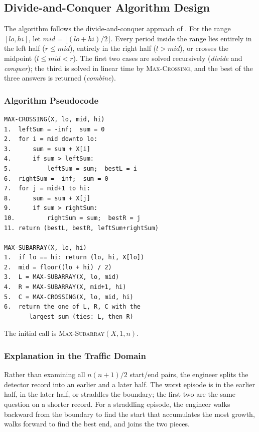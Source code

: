 \subsection{Divide-and-Conquer Algorithm Design}

The algorithm follows the divide-and-conquer approach
of \cite{bentley1984, clrs2009}. For the range
$[\mathit{lo}, \mathit{hi}]$, let
$\mathit{mid} = \lfloor (\mathit{lo} + \mathit{hi})/2 \rfloor$.
Every period inside the range lies entirely in the left
half ($r \le \mathit{mid}$), entirely in the right half
($l > \mathit{mid}$), or crosses the midpoint
($l \le \mathit{mid} < r$). The first two cases are
solved recursively (\emph{divide} and \emph{conquer});
the third is solved in linear time by
\textsc{Max-Crossing}, and the best of the three answers
is returned (\emph{combine}).

\subsubsection{Algorithm Pseudocode}

\begin{verbatim}
MAX-CROSSING(X, lo, mid, hi)
1.  leftSum = -inf;  sum = 0
2.  for i = mid downto lo:
3.      sum = sum + X[i]
4.      if sum > leftSum:
5.          leftSum = sum;  bestL = i
6.  rightSum = -inf;  sum = 0
7.  for j = mid+1 to hi:
8.      sum = sum + X[j]
9.      if sum > rightSum:
10.         rightSum = sum;  bestR = j
11. return (bestL, bestR, leftSum+rightSum)

MAX-SUBARRAY(X, lo, hi)
1.  if lo == hi: return (lo, hi, X[lo])
2.  mid = floor((lo + hi) / 2)
3.  L = MAX-SUBARRAY(X, lo, mid)
4.  R = MAX-SUBARRAY(X, mid+1, hi)
5.  C = MAX-CROSSING(X, lo, mid, hi)
6.  return the one of L, R, C with the
       largest sum (ties: L, then R)
\end{verbatim}

\noindent The initial call is
\textsc{Max-Subarray}$(X, 1, n)$.

\subsubsection{Explanation in the Traffic Domain}

Rather than examining all $n(n+1)/2$ start/end pairs,
the engineer splits the detector record into an earlier
and a later half. The worst episode is in the earlier
half, in the later half, or straddles the boundary; the
first two are the same question on a shorter record. For
a straddling episode, the engineer walks backward from
the boundary to find the start that accumulates the most
growth, walks forward to find the best end, and joins
the two pieces.

